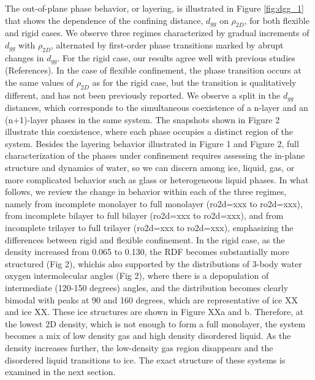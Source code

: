 \documentclass[12pt]{article}
\begin{document}
The out-of-plane phase behavior, or layering, is illustrated in Figure \ref{fig:dgg_1} that shows the dependence of the confining distance, \(d_{gg}\) on \(\rho_{2D}\), for both flexible and rigid cases. We observe three regimes characterized by gradual increments of \(d_{gg}\) with \(\rho_{2D}\), alternated by first-order phase transitions marked by abrupt changes in \(d_{gg}\). For the rigid case, our results agree well with previous studies (References). In the case of flexible confinement, the phase transition occurs at the same values of \(\rho_{2D}\) as for the rigid case, but the transition is qualitatively different, and has not been previously reported. We observe a split in the \(d_{gg}\) distances, which corresponds to the simultaneous coexistence of a n-layer and an (n+1)-layer phases in the same system. The snapshots shown in Figure 2 illustrate this coexistence, where each phase occupies a distinct region of the system.
Besides the layering behavior illustrated in Figure 1 and Figure 2, full characterization of the phases under confinement requires assessing the in-plane structure and dynamics of water, so we can discern among ice, liquid, gas, or more complicated behavior such as glass or heterogeneous liquid phases. In what follows, we review the change in behavior within each of the three regimes, namely from incomplete monolayer to full monolayer (ro2d=xxx to ro2d=xxx), from incomplete bilayer to full bilayer (ro2d=xxx to ro2d=xxx), and from incomplete trilayer to full trilayer (ro2d=xxx to ro2d=xxx), emphasizing the differences between rigid and flexible confinement.
 In the rigid case, as the density increased from 0.065 to 0.130, the RDF becomes substantially more structured (Fig 2),  whichis also supported by the distributions of 3-body water oxygen intermolecular angles (Fig 2), where there is a depopulation of intermediate (120-150 degrees) angles, and the distribution becomes clearly bimodal with peaks at 90 and 160 degrees, which are representative of ice XX and ice XX. These ice structures are shown in Figure XXa and b. Therefore, at the lowest 2D density, which is not enough to form a full monolayer, the system becomes a mix of low density gas and high density disordered liquid. As the density increases further, the low-density gas region disappears and the disordered liquid transitions to ice. The exact structure of these systems is examined in the next section.
\end{document}
